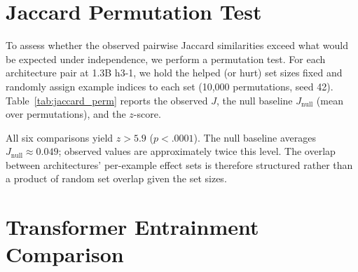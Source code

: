 \section{Jaccard Permutation Test}\label{app:jaccard_permutation}

To assess whether the observed pairwise Jaccard similarities exceed what would be expected under independence, we perform a permutation test. For each architecture pair at 1.3B h3-1, we hold the helped (or hurt) set sizes fixed and randomly assign example indices to each set (10{,}000 permutations, seed 42). Table~\ref{tab:jaccard_perm} reports the observed $J$, the null baseline $J_{\text{null}}$ (mean over permutations), and the $z$-score.

\begin{table}[ht]
\centering
\caption{Permutation test for pairwise Jaccard similarity (1.3B h3-1 on LAMBADA, 10{,}000 permutations). All observed values significantly exceed the independence baseline.}
\label{tab:jaccard_perm}
\end{table}

All six comparisons yield $z > 5.9$ ($p < .0001$). The null baseline averages $J_{\text{null}} \approx 0.049$; observed values are approximately twice this level. The overlap between architectures' per-example effect sets is therefore structured rather than a product of random set overlap given the set sizes.

\section{Transformer Entrainment Comparison}\label{app:transformer_entrainment}

